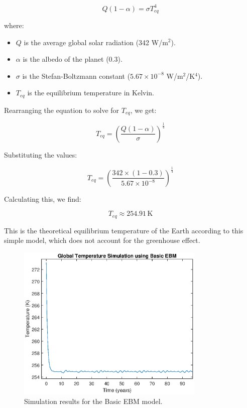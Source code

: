 \documentclass[12pt]{article}
\begin{document}
\begin{equation}
Q(1 - \alpha) = \sigma T_{eq}^4
\end{equation}

where:
\begin{itemize}
    \item $Q$ is the average global solar radiation (342 W/m$^2$).
    \item $\alpha$ is the albedo of the planet (0.3).
    \item $\sigma$ is the Stefan-Boltzmann constant ($5.67 \times 10^{-8}$ W/m$^2$/K$^4$).
    \item $T_{eq}$ is the equilibrium temperature in Kelvin.
\end{itemize}

Rearranging the equation to solve for $T_{eq}$, we get:

\begin{equation}
T_{eq} = \left( \frac{Q(1 - \alpha)}{\sigma} \right)^{\frac{1}{4}}
\end{equation}

Substituting the values:

\begin{equation}
T_{eq} = \left( \frac{342 \times (1 - 0.3)}{5.67 \times 10^{-8}} \right)^{\frac{1}{4}}
\end{equation}

Calculating this, we find:

\begin{equation}
T_{eq} \approx 254.91 \, \text{K}
\end{equation}

This is the theoretical equilibrium temperature of the Earth according to this simple model, which does not account for the greenhouse effect.


\begin{figure}[ht]
\centering
\includegraphics[width=0.8\textwidth]{ebm_basic.eps}
\caption{Simulation results for the Basic EBM model.}
\label{fig:basicEBM}
\end{figure}
\end{document}
